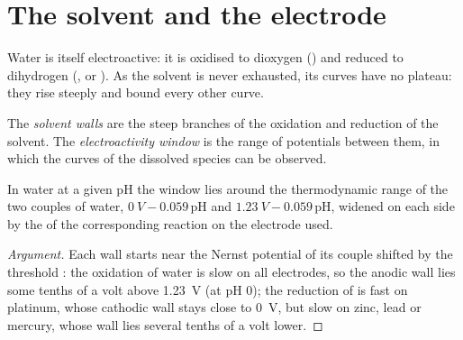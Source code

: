 \section{The solvent and the electrode}

Water is itself electroactive: it is oxidised to dioxygen
() and reduced to dihydrogen (, or
). As the solvent is never exhausted, its curves
have no plateau: they rise steeply and bound every other curve.

\begin{definition}\label{def:b2:current-potential-curves:window}
The \emph{solvent walls} are the steep branches of the
oxidation and reduction of the solvent. The \emph{electroactivity
window} is the range of potentials between them,
in which the curves of the dissolved species can be observed.
\end{definition}

\begin{proposition}\label{prop:b2:current-potential-curves:window}
In water at a given pH the window lies around the thermodynamic range of the
two couples of water, $\qty{0}{V} - 0.059\,\mathrm{pH}$ and $\qty{1.23}{V} -
0.059\,\mathrm{pH}$, widened on each side by the  of the
corresponding reaction on the electrode used.
\end{proposition}

\begin{proof}[Argument]
Each wall starts near the Nernst potential of its couple shifted by the
threshold : the oxidation of water is slow on all electrodes, so
the anodic wall lies some tenths of a volt above \qty{1.23}{V} (at pH 0); the
reduction of  is fast on platinum, whose cathodic wall stays close to
\qty{0}{V}, but slow on zinc, lead or mercury, whose wall lies several tenths of
a volt lower.
\end{proof}


